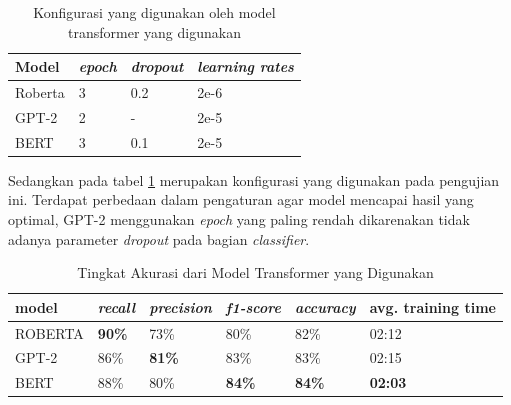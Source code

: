 \begin{table}[h]
    \centering
    \caption{Konfigurasi yang digunakan oleh model transformer yang digunakan}
    \label{tab: transformer_config}
    \begin{tabular}{|l|l|l|l|}
        \hline
        \textbf{Model} & \textit{\textbf{epoch}} & \textit{\textbf{dropout}} & \textit{\textbf{learning rates}} \\ \hline
        Roberta        & 3                       & 0.2                       & 2e-6                             \\ \hline
        GPT-2          & 2                       & -                         & 2e-5                             \\ \hline
        BERT           & 3                       & 0.1                       & 2e-5                             \\ \hline
    \end{tabular}
\end{table}

Sedangkan pada tabel \ref{tab: transformer_config} merupakan konfigurasi yang digunakan pada pengujian ini. Terdapat perbedaan dalam pengaturan agar model mencapai hasil yang optimal, GPT-2 menggunakan \textit{epoch} yang paling rendah dikarenakan tidak adanya parameter \textit{dropout} pada bagian \textit{classifier}.

\begin{table}[h]
    \centering
    \caption{Tingkat Akurasi dari Model Transformer yang Digunakan}
    \label{tab: model_transformer_result}
    \begin{tabular}{|l|l|l|l|l|p{.12\linewidth}|}
        \hline
        \textbf{model} & \textit{\textbf{recall}} & \textit{\textbf{precision}} & \textit{\textbf{f1-score}} & \textit{\textbf{accuracy}} & \textbf{avg. training time} \\ \hline
        ROBERTA        & \textbf{90\%}            & 73\%                        & 80\%                       & 82\%                       & 02:12                       \\ \hline
        GPT-2          & 86\%                     & \textbf{81\%}               & 83\%                       & 83\%                       & 02:15                       \\ \hline
        BERT           & 88\%                     & 80\%                        & \textbf{84\%}              & \textbf{84\%}              & \textbf{02:03}              \\ \hline
    \end{tabular}
\end{table}

